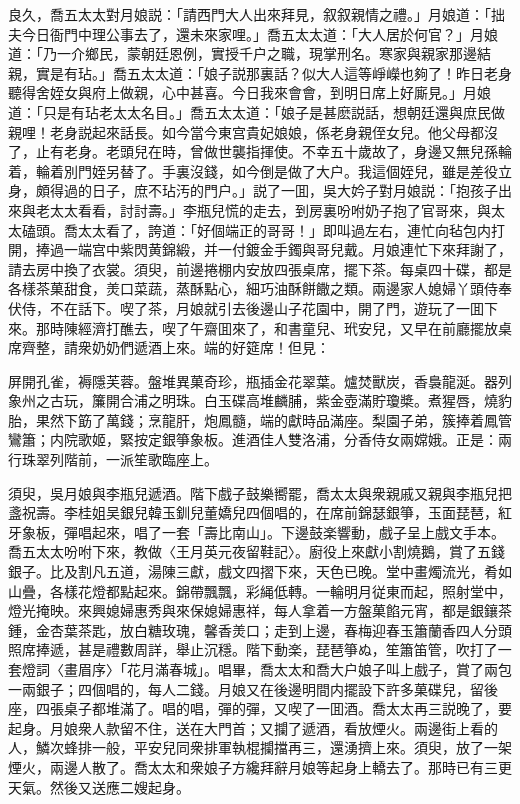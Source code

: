 良久，喬五太太對月娘説：「請西門大人出來拜見，叙叙親情之禮。」月娘道：「拙夫今日衙門中理公事去了，還未來家哩。」喬五太太道：「大人居於何官？」月娘道：「乃一介鄉民，蒙朝廷恩例，實授千户之職，現掌刑名。寒家與親家那邊結親，實是有玷。」喬五太太道：「娘子説那裏話？似大人這等崢嶸也夠了！昨日老身聽得舍姪女與府上做親，心中甚喜。今日我來會會，到明日席上好廝見。」月娘道：「只是有玷老太太名目。」喬五太太道：「娘子是甚麽説話，想朝廷還與庶民做親哩！老身説起來話長。如今當今東宫貴妃娘娘，係老身親侄女兒。他父母都沒了，止有老身。老頭兒在時，曾做世襲指揮使。不幸五十歲故了，身邊又無兒孫輪着，輪着別門姪另替了。手裏沒錢，如今倒是做了大户。我這個姪兒，雖是差役立身，頗得過的日子，庶不玷汚的門户。」説了一囬，吳大妗子對月娘説：「抱孩子出來與老太太看看，討討壽。」李瓶兒慌的走去，到房裏吩咐奶子抱了官哥來，與太太磕頭。喬太太看了，誇道：「好個端正的哥哥！」即叫過左右，連忙向毡包内打開，捧過一端宫中紫閃黄錦緞，并一付鍍金手鐲與哥兒戴。月娘連忙下來拜謝了，請去房中換了衣裳。須臾，前邊捲棚内安放四張桌席，擺下茶。每桌四十碟，都是各樣茶菓甜食，羙口菜蔬，蒸酥點心，細巧油酥餅饊之類。兩邊家人媳婦丫頭侍奉伏侍，不在話下。喫了茶，月娘就引去後邊山子花園中，開了門，遊玩了一囬下來。那時陳經濟打醮去，喫了午齋囬來了，和書童兒、玳安兒，又早在前廳擺放桌席齊整，請衆奶奶們遞酒上來。端的好筵席！但見：

屏開孔雀，褥隱芙蓉。盤堆異菓奇珍，瓶插金花翠葉。爐焚獸炭，香裊龍涎。器列象州之古玩，簾開合浦之明珠。白玉碟高堆麟脯，紫金壺滿貯瓊槳。煮猩唇，燒豹胎，果然下筯了萬錢；烹龍肝，炮鳳髓，端的獻時品滿座。梨園子弟，簇捧着鳳管鸞簫；内院歌姬，緊按定銀箏象板。進酒佳人雙洛浦，分香侍女兩嫦娥。正是：兩行珠翠列階前，一派笙歌臨座上。

須臾，吳月娘與李瓶兒遞酒。階下戲子鼓樂嚮罷，喬太太與衆親戚又親與李瓶兒把盞祝壽。李桂姐吴銀兒韓玉釧兒董嬌兒四個唱的，在席前錦瑟銀箏，玉面琵琶，紅牙象板，彈唱起來，唱了一套「壽比南山」。下邊鼓楽響動，戲子呈上戲文手本。喬五太太吩咐下來，教做〈王月英元夜留鞋記〉。廚役上來獻小割燒鵝，賞了五錢銀子。比及割凡五道，湯陳三獻，戲文四摺下來，天色已晚。堂中畫燭流光，肴如山疊，各樣花燈都點起來。錦帶飄飄，彩䋲低轉。一輪明月従東而起，照射堂中，燈光掩映。來興媳婦惠秀與來保媳婦惠祥，每人拿着一方盤菓餡元宵，都是銀鑲茶鍾，金杏葉茶匙，放白糖玫瑰，馨香羙口；走到上邊，春梅迎春玉簫蘭香四人分頭照席捧遞，甚是禮數周詳，舉止沉穩。階下動楽，琵琶箏ぬ，笙簫笛管，吹打了一套燈詞〈畫眉序〉「花月滿春城」。唱畢，喬太太和喬大户娘子叫上戲子，賞了兩包一兩銀子；四個唱的，每人二錢。月娘又在後邊明間内擺設下許多菓碟兒，留後座，四張桌子都堆滿了。唱的唱，彈的彈，又喫了一囬酒。喬太太再三説晚了，要起身。月娘衆人款留不住，送在大門首；又攔了遞酒，看放煙火。兩邊街上看的人，鱗次蜂排一般，平安兒同衆排軍執棍攔擋再三，還湧擠上來。須臾，放了一架煙火，兩邊人散了。喬太太和衆娘子方纔拜辭月娘等起身上轎去了。那時已有三更天氣。然後又送應二嫂起身。

